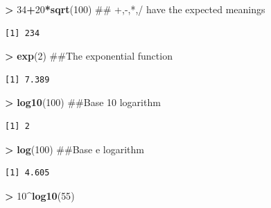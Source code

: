 \documentclass[]{krantz}
\makeatletter
\newenvironment{Shaded}{\begin{snugshade}}{\end{snugshade}}
\newcommand{\KeywordTok}[1]{\textcolor[rgb]{0.27,0.27,0.27}{\textbf{#1}}}
\newcommand{\DecValTok}[1]{\textcolor[rgb]{0.06,0.06,0.06}{#1}}
\newcommand{\StringTok}[1]{\textcolor[rgb]{0.5,0.5,0.5}{#1}}
\newcommand{\OperatorTok}[1]{\textcolor[rgb]{0.43,0.43,0.43}{\textbf{#1}}}
\newcommand{\NormalTok}[1]{#1}
\newenvironment{kframe}{%
\medskip{}
\setlength{\fboxsep}{.8em}
 \def\at@end@of@kframe{}%
 \ifinner\ifhmode%
  \def\at@end@of@kframe{\end{minipage}}%
  \begin{minipage}{\columnwidth}%
 \fi\fi%
 \def\FrameCommand##1{\hskip\@totalleftmargin \hskip-\fboxsep
 \colorbox{shadecolor}{##1}\hskip-\fboxsep
     \hskip-\linewidth \hskip-\@totalleftmargin \hskip\columnwidth}%
 \MakeFramed {\advance\hsize-\width
   \@totalleftmargin\z@ \linewidth\hsize
   \@setminipage}}%
 {\par\unskip\endMakeFramed%
 \at@end@of@kframe}
\renewenvironment{Shaded}{\begin{kframe}}{\end{kframe}}
\makeatother
\begin{document}
\begin{Shaded}
\begin{Highlighting}[]
\OperatorTok{>}\StringTok{ }\DecValTok{34}\OperatorTok{+}\DecValTok{20}\OperatorTok{*}\KeywordTok{sqrt}\NormalTok{(}\DecValTok{100}\NormalTok{)  ## +,-,*,/ have the expected meanings}
\end{Highlighting}
\end{Shaded}

\begin{verbatim}
[1] 234
\end{verbatim}

\begin{Shaded}
\begin{Highlighting}[]
\OperatorTok{>}\StringTok{ }\KeywordTok{exp}\NormalTok{(}\DecValTok{2}\NormalTok{)  ##The exponential function}
\end{Highlighting}
\end{Shaded}

\begin{verbatim}
[1] 7.389
\end{verbatim}

\begin{Shaded}
\begin{Highlighting}[]
\OperatorTok{>}\StringTok{ }\KeywordTok{log10}\NormalTok{(}\DecValTok{100}\NormalTok{)  ##Base 10 logarithm}
\end{Highlighting}
\end{Shaded}

\begin{verbatim}
[1] 2
\end{verbatim}

\begin{Shaded}
\begin{Highlighting}[]
\OperatorTok{>}\StringTok{ }\KeywordTok{log}\NormalTok{(}\DecValTok{100}\NormalTok{)  ##Base e logarithm}
\end{Highlighting}
\end{Shaded}

\begin{verbatim}
[1] 4.605
\end{verbatim}

\begin{Shaded}
\begin{Highlighting}[]
\OperatorTok{>}\StringTok{ }\DecValTok{10}\OperatorTok{^}\KeywordTok{log10}\NormalTok{(}\DecValTok{55}\NormalTok{)}
\end{Highlighting}
\end{Shaded}
\end{document}
